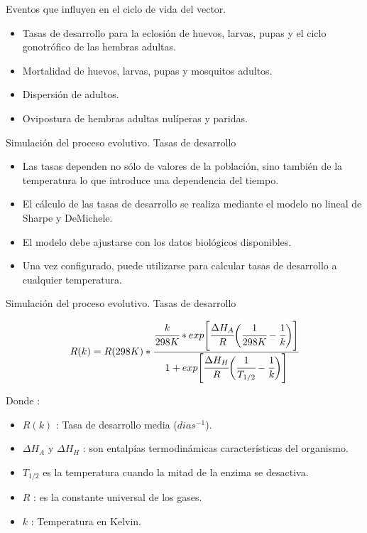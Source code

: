 \begin{frame}[c]{Eventos que influyen en el ciclo de vida del vector.}
  \begin{itemize}
    \item Tasas de desarrollo para la eclosión de huevos, larvas, pupas y el ciclo gonotrófico de las hembras adultas.
    \item Mortalidad de huevos, larvas, pupas y mosquitos adultos.
    \item Dispersión de adultos.
    \item Ovipostura de hembras adultas nulíperas y paridas.
  \end{itemize}
\end{frame}

\begin{frame}[c]{Simulación del proceso evolutivo. Tasas de desarrollo}
  \begin{itemize}

    \item Las tasas dependen no sólo de valores de la población, sino también de la temperatura lo que introduce una dependencia del tiempo.

    \item El cálculo de las tasas de desarrollo se realiza mediante el modelo no lineal de Sharpe y DeMichele.

    \item El modelo debe ajustarse con los datos biológicos disponibles.
    \item Una vez configurado, puede utilizarse para calcular tasas de desarrollo a cualquier temperatura.
  \end{itemize}
\end{frame}

\begin{frame}[c]{Simulación del proceso evolutivo. Tasas de desarrollo}
\begin{center}
    \begin{equation} \label{eq:schoolfield}
       R(k)  = R(298K) *\cfrac{ \cfrac{k}{298K} *
        exp \Bigg[
                \cfrac{\Delta H_{A}}{R} \bigg(\cfrac{1}{298K} - \cfrac{1}{k}\bigg)
            \Bigg]}
        {1 + exp\Bigg[\cfrac{\Delta H_{H}}{R} \bigg(\cfrac{1}{T_{1/2}}- \cfrac{1}{k}\bigg)\Bigg] }
    \end{equation}
\end{center}
Donde :
 \begin{itemize}
    \item $R(k)$ : Tasa de desarrollo media ($dias^{-1}$).
    \item $\Delta H_{A}$ y $\Delta H_{H}$ : son entalpías termodinámicas características del organismo.
    \item $T_{1/2}$ es la temperatura cuando la mitad de la enzima se desactiva.
    \item $R$ : es la constante universal de los gases.
    \item $k$ : Temperatura en Kelvin.
    \end{itemize}
\end{frame}


